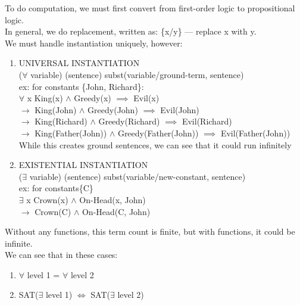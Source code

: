 \documentclass[../../lecture_notes.tex]{subfiles}
\begin{document}
\noindent To do computation, we must first convert from first-order logic to propositional logic.\\
In general, we do replacement, written as: \{x/y\} — replace x with y.\\
We must handle instantiation uniquely, however:\\
\begin{enumerate} [itemsep=0mm]
	\item UNIVERSAL INSTANTIATION\\
		($\forall$ variable) (sentence) subst({variable/ground-term}, sentence)\\
		ex: for constants \{John, Richard\}:\\
		$\forall$ x King(x) $\land$ Greedy(x) $\implies$ Evil(x)\\
		$\rightarrow$ King(John) $\land$ Greedy(John) $\implies$ Evil(John)\\
		$\rightarrow$ King(Richard) $\land$ Greedy(Richard) $\implies$ Evil(Richard)\\
		$\rightarrow$ King(Father(John)) $\land$ Greedy(Father(John)) $\implies$ Evil(Father(John))\\
		While this creates ground sentences, we can see that it could run infinitely
	\item EXISTENTIAL INSTANTIATION\\
		($\exists$ variable) (sentence) subst({variable/new-constant}, sentence)\\
		ex: for constants\{C\}\\
		$\exists$ x Crown(x) $\land$ On-Head(x, John)\\
		$\rightarrow$ Crown(C) $\land$ On-Head(C, John)\\
\end{enumerate}
\noindent Without any functions, this term count is finite, but with functions, it could be infinite.\\
We can see that in these cases:
\begin{enumerate} [itemsep=0mm]
	\item $\forall$ level 1 = $\forall$ level 2
	\item SAT($\exists$ level 1) $\iff$ SAT($\exists$ level 2)
\end{enumerate}
\end{document}
